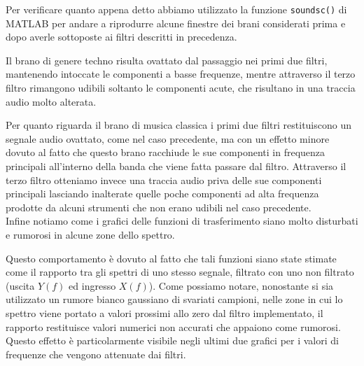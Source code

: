\documentclass[../main.tex]{subfiles}
\begin{document}
Per verificare quanto appena detto abbiamo utilizzato la funzione \texttt{soundsc()} di MATLAB per andare a riprodurre alcune finestre dei brani considerati prima e dopo averle sottoposte ai filtri descritti in precedenza.

Il brano di genere techno risulta ovattato dal passaggio nei primi due filtri, mantenendo intoccate le componenti a basse frequenze, mentre attraverso il terzo filtro rimangono udibili soltanto le componenti acute, che risultano in una traccia audio molto alterata.

Per quanto riguarda il brano di musica classica i primi due filtri restituiscono un segnale audio ovattato, come nel caso precedente, ma con un effetto minore dovuto al fatto che questo brano racchiude le sue componenti in frequenza principali all’interno della banda che viene fatta passare dal filtro. Attraverso il terzo filtro otteniamo invece una traccia audio priva delle sue componenti principali lasciando inalterate quelle poche componenti ad alta frequenza prodotte da alcuni strumenti che non erano udibili nel caso precedente.\\

Infine notiamo come i grafici delle funzioni di trasferimento siano molto disturbati e rumorosi in alcune zone dello spettro. 

Questo comportamento è dovuto al fatto che tali funzioni siano state stimate come il rapporto tra gli spettri di uno stesso segnale, filtrato con uno non filtrato (uscita $Y(f)$ ed ingresso $X(f)$). Come possiamo notare, nonostante si sia utilizzato un rumore bianco gaussiano di svariati campioni,  nelle zone in cui lo spettro viene portato a valori prossimi allo zero dal filtro implementato, il rapporto restituisce valori numerici non accurati che appaiono come rumorosi. Questo effetto è particolarmente visibile negli ultimi due grafici per i valori di frequenze che vengono attenuate dai filtri.
\end{document}
